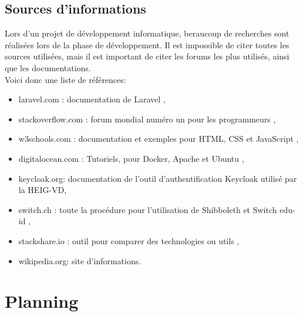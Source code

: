 \documentclass[
    iai, %
    il, %
]{heig-tb}
\begin{document}
\section{Sources d'informations}
Lors d'un projet de développement informatique, beraucoup de recherches sont réalisées lors de la
phase de développement. Il est impossible de citer toutes les sources utilisées, mais il est
important de citer les forums les plus utilisés, ainsi que les documentations.\\
Voici donc une liste de références:

\begin{itemize}
    \item laravel.com : documentation de Laravel \cite{laravel},
    \item stackoverflow.com : forum mondial numéro un pour les programmeurs \cite{stackoverflow},
    \item w3schools.com : documentation et exemples pour HTML, CSS et JavaScript \cite{w3schools},
    \item digitalocean.com : Tutoriels, pour Docker, Apache et Ubuntu \cite{digitalocean},
    \item keycloak.org: documentation de l'outil d'authentification Keycloak utilisé par la HEIG-VD,
    \item switch.ch : toute la procédure pour l’utilisation de Shibboleth et Switch edu-id \cite{switch},
    \item stackshare.io : outil pour comparer des technologies ou utils \cite{stackshare},
    \item wikipedia.org: site d'informations.
\end{itemize}


\vfil
\hspace{8cm}\makeatletter\@author\makeatother\par
\hspace{8cm}\begin{minipage}{5cm}
    \printsignature
\end{minipage}
\clearpage

\appendix
\appendixpage
\addappheadtotoc

\chapter{Planning}

\begin{landscape}
    
\end{landscape}
\end{document}
